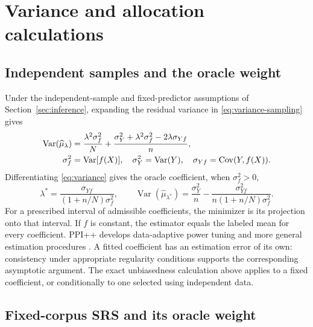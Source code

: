 \documentclass[11pt,a4paper]{article}
\newcommand{\Var}{\operatorname{Var}}
\newcommand{\Cov}{\operatorname{Cov}}
\begin{document}
\appendix
\section{Variance and allocation calculations}\label{app:derivations}

\subsection{Independent samples and the oracle weight}

Under the independent-sample and fixed-predictor assumptions of Section~\ref{sec:inference}, expanding the residual variance in \eqref{eq:variance-sampling} gives
\begin{align}
 \Var(\widehat\mu_\lambda)
 &=\frac{\lambda^2\sigma_f^2}{N}
 +\frac{\sigma_Y^2+\lambda^2\sigma_f^2-2\lambda\sigma_{Yf}}{n},
 \label{eq:variance}\\
 \sigma_f^2&=\Var[f(X)],\quad
 \sigma_Y^2=\Var(Y),\quad
 \sigma_{Yf}=\Cov(Y,f(X)).\notag
\end{align}
Differentiating \eqref{eq:variance} gives the oracle coefficient, when $\sigma_f^2>0$,
\begin{equation}
 \lambda^*=\frac{\sigma_{Yf}}{(1+n/N)\sigma_f^2},\qquad
 \Var(\widehat\mu_{\lambda^*})
 =\frac{\sigma_Y^2}{n}
 -\frac{\sigma_{Yf}^2}{n(1+n/N)\sigma_f^2}.
 \label{eq:optimal}
\end{equation}
For a prescribed interval of admissible coefficients, the minimizer is its projection onto that interval. If $f$ is constant, the estimator equals the labeled mean for every coefficient. PPI++ develops data-adaptive power tuning and more general estimation procedures \citep{ppiplus2024}. A fitted coefficient has an estimation error of its own: consistency under appropriate regularity conditions supports the corresponding asymptotic argument. The exact unbiasedness calculation above applies to a fixed coefficient, or conditionally to one selected using independent data.

\subsection{Fixed-corpus SRS and its oracle weight}\label{app:finite-weight}
\end{document}
